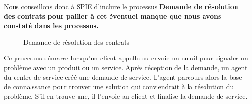 Nous conseillons donc à SPIE d’inclure le processus \bf{Demande de résolution des contrats} pour pallier à cet éventuel manque que nous avons constaté dans les processus. \\

\begin{figure}[H]
    \label{fig-gestion-contrats-client}
    \noindent{}
    \caption{Demande de résolution des contrats}
\end{figure}

Ce processus démarre lorsqu’un client appelle ou envoie un email pour signaler un problème avec un produit ou un service. Après réception de la demande, un agent du centre de service créé une demande de service. L’agent parcours alors la base de connaissance pour trouver une solution qui conviendrait à la résolution du problème. S’il en trouve une, il l’envoie au client et finalise la demande de service.

